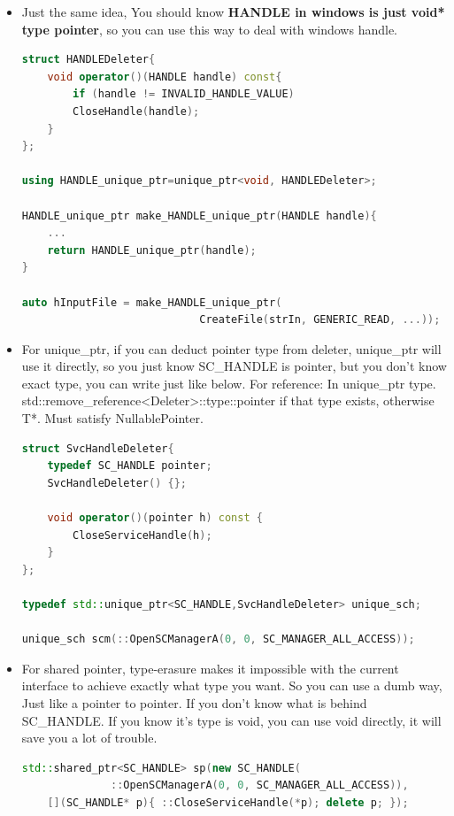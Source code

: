 \documentclass[a4paper,11pt,twoside]{book}
\begin{document}
\begin{itemize}
\item Just the same idea, You should know \textbf{HANDLE in windows is just void* type pointer}, so you can use this way to deal with windows handle.
	
\begin{lstlisting}[frame=single, language=c++]
struct HANDLEDeleter{
	void operator()(HANDLE handle) const{
		if (handle != INVALID_HANDLE_VALUE)
		CloseHandle(handle);
	}
};
	
using HANDLE_unique_ptr=unique_ptr<void, HANDLEDeleter>;
	
HANDLE_unique_ptr make_HANDLE_unique_ptr(HANDLE handle){
	...
	return HANDLE_unique_ptr(handle);
}
	
auto hInputFile = make_HANDLE_unique_ptr(
                            CreateFile(strIn, GENERIC_READ, ...));
\end{lstlisting}
	

	
\item For unique\_ptr, if you can deduct pointer type from deleter, unique\_ptr will use it directly, so you just know SC\_HANDLE is pointer, but you don't know exact type, you can write just like below.  For reference: In unique\_ptr type. std::remove\_reference<Deleter>::type::pointer if that type exists, otherwise T*. Must satisfy NullablePointer.

\begin{lstlisting}[frame=single, language=c++]
struct SvcHandleDeleter{
	typedef SC_HANDLE pointer;
	SvcHandleDeleter() {};
	
	void operator()(pointer h) const {
		CloseServiceHandle(h);
	}
};
	
typedef std::unique_ptr<SC_HANDLE,SvcHandleDeleter> unique_sch;
	
unique_sch scm(::OpenSCManagerA(0, 0, SC_MANAGER_ALL_ACCESS));
\end{lstlisting}
	
	\item For shared pointer, type-erasure makes it impossible with the current interface to achieve exactly what type you want. So you can use a dumb way, Just like a pointer to pointer. If you don't know what is behind SC\_HANDLE. If you know it's type is void, you can use void directly, it will save you a lot of trouble. 
	
\begin{lstlisting}[frame=single, language=c++]
std::shared_ptr<SC_HANDLE> sp(new SC_HANDLE(
              ::OpenSCManagerA(0, 0, SC_MANAGER_ALL_ACCESS)),
	[](SC_HANDLE* p){ ::CloseServiceHandle(*p); delete p; });
\end{lstlisting}


\end{itemize}
\end{document}
